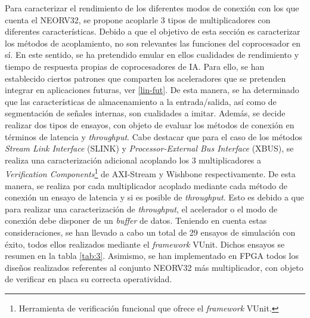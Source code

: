 Para caracterizar el rendimiento de los diferentes modos de conexión con los que cuenta el NEORV32, se propone acoplarle 3 tipos de multiplicadores con diferentes características.
Debido a que el objetivo de esta sección es caracterizar los métodos de acoplamiento, no son relevantes las funciones del coprocesador en sí. 
En este sentido, se ha pretendido emular en ellos cualidades de rendimiento y tiempo de respuesta propias de coprocesadores de IA.
Para ello, se han establecido ciertos patrones que comparten los aceleradores que se pretenden integrar en aplicaciones futuras, ver \ref{lin-fut}.
De esta manera, se ha determinado que las características de almacenamiento a la entrada/salida, así como de segmentación de señales internas, son cualidades a imitar.
Además, se decide realizar dos tipos de ensayos, con objeto de evaluar los métodos de conexión en términos de latencia y \textit{throughput}.
Cabe destacar que para el caso de los métodos \textit{Stream Link Interface} (SLINK) y \textit{Processor-External Bus Interface} (XBUS), se realiza una caracterización adicional acoplando los 3 multiplicadores a \textit{Verification Components}\footnote{Herramienta de verificación funcional que ofrece el \textit{framework} VUnit.} de AXI-Stream y Wishbone respectivamente.
De esta manera, se realiza por cada multiplicador acoplado mediante cada método de conexión un ensayo de latencia y si es posible de \textit{throughput}.
Esto es debido a que para realizar una caracterización de \textit{throughput}, el acelerador o el modo de conexión debe disponer de un \textit{buffer} de datos.
Teniendo en cuenta estas consideraciones, se han llevado a cabo un total de 29 ensayos de simulación con éxito, todos ellos realizados mediante el \textit{framework} VUnit.
Dichos ensayos se resumen en la tabla \ref{tab:3}.
Asimismo, se han implementado en FPGA todos los diseños realizados referentes al conjunto NEORV32 más multiplicador, con objeto de verificar en placa su correcta operatividad.


